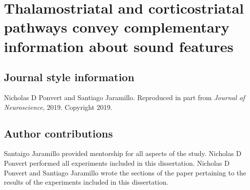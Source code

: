 \newcommand{\Anatomy}{1}
\newcommand{\AnatomyInjection}{\Anatomy A}
\newcommand{\AnatomyThalExample}{\Anatomy B}
\newcommand{\AnatomyThalSummary}{\Anatomy C}
\newcommand{\AnatomyThalamus}{\Anatomy B, C}
\newcommand{\AnatomyACExample}{\Anatomy D}
\newcommand{\AnatomyACSummary}{\Anatomy E}
\newcommand{\AnatomyAC}{\Anatomy D, E}

\newcommand{\Method}{2}
\newcommand{\MethodDiagram}{\Method A}
\newcommand{\MethodDirectCell}{\Method B}
\newcommand{\MethodDirectCellAndNBQXPop}{\Method B, F}
\newcommand{\MethodIndirectNoFollow}{\Method C}
\newcommand{\MethodLongLatency}{\Method C, D}
\newcommand{\MethodIndirectFollows}{\Method D}
\newcommand{\MethodSoundCharPop}{\Method E}

\newcommand{\NoiseLaser}{3}
\newcommand{\NoiseLaserThalDiagram}{\NoiseLaser A}
\newcommand{\NoiseLaserThalExample}{\NoiseLaser B}
\newcommand{\NoiseLaserThalLocations}{\NoiseLaser C}
\newcommand{\NoiseLaserACDiagram}{\NoiseLaser D}
\newcommand{\NoiseLaserACExample}{\NoiseLaser E}
\newcommand{\NoiseLaserACLocations}{\NoiseLaser F}
\newcommand{\NoiseLaserDiagrams}{\NoiseLaser A, D}

\newcommand{\Frequency}{4}
\newcommand{\FrequencyThalExample}{\Frequency A}
\newcommand{\FrequencyACExample}{\Frequency B}
\newcommand{\FrequencyBW}{\Frequency C}
\newcommand{\FrequencyThreshold}{\Frequency D}
\newcommand{\FrequencyLatency}{\Frequency E}
\newcommand{\FrequencyOnsetivity}{\Frequency F}
\newcommand{\FrequencyMonotonicity}{\Frequency G}

\newcommand{\AM}{5}
\newcommand{\AMThalExamples}{\AM A, B}
\newcommand{\AMACExamples}{\AM E, F}
\newcommand{\AMPies}{\AM C}
\newcommand{\AMSync}{\AM D}
\newcommand{\AMRateDiscrim}{\AM G}
\newcommand{\AMPhaseDiscrim}{\AM H}

\chapter{Thalamostriatal and corticostriatal pathways convey complementary information about sound features}

\section{Journal style information}
\noindent Nicholas D Ponvert and Santiago Jaramillo. Reproduced in part from \textit{Journal of Neuroscience}, 2019. Copyright 2019.

\section{Author contributions}
Santaigo Jaramillo provided mentorship for all aspects of the study. Nicholas D Ponvert performed all experiments included in this dissertation. Nicholas D Ponvert and Santiago Jaramillo wrote the sections of the paper pertaining to the results of the experiments included in this dissertation. 

